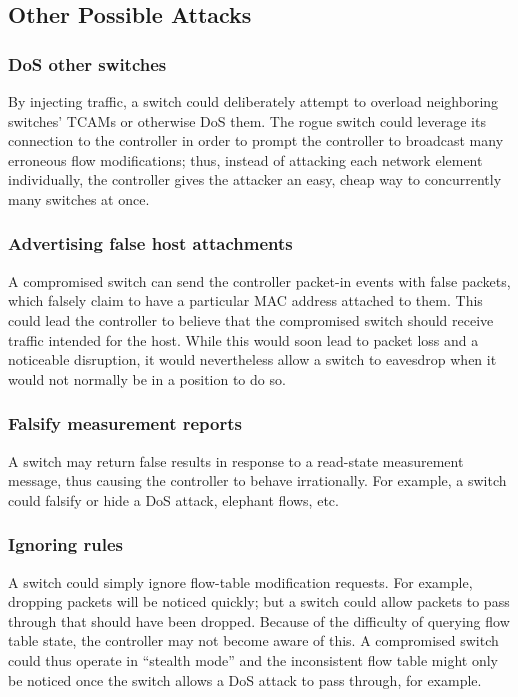 \subsection{Other Possible Attacks}
\subsubsection{DoS other switches}
By injecting traffic, a switch could deliberately attempt to overload neighboring switches' TCAMs or otherwise DoS them. The rogue switch could leverage its connection to the controller in order to prompt the controller to broadcast many erroneous flow modifications; thus, instead of attacking each network element individually, the controller gives the attacker an easy, cheap way to concurrently many switches at once. 

\subsubsection{Advertising false host attachments}
A compromised switch can send the controller packet-in events with false packets, which falsely claim to have a particular MAC address attached to them. This could lead the controller to believe that the compromised switch should receive traffic intended for the host. While this would soon lead to packet loss and a noticeable disruption, it would nevertheless allow a switch to eavesdrop when it would not normally be in a position to do so.

\subsubsection{Falsify measurement reports}
A switch may return false results in response to a read-state  measurement message, thus causing the controller to behave irrationally. For example, a switch could falsify or hide a DoS attack, elephant flows, etc.

\subsubsection{Ignoring rules}
A switch could simply ignore flow-table modification requests. For example, dropping packets will be noticed quickly; but a switch could allow packets to pass through that should have been dropped. Because of the difficulty of querying flow table state, the controller may not become aware of this. A compromised switch could thus operate in “stealth mode” and the inconsistent flow table might only be noticed once the switch allows a DoS attack to pass through, for example.

